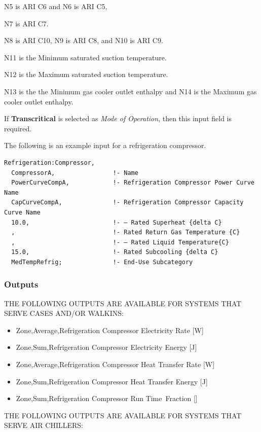 N5 is ARI C6 and N6 is ARI C5,

N7 is ARI C7.

N8 is ARI C10, N9 is ARI C8, and N10 is ARI C9.

N11 is the Minimum saturated suction temperature.

N12 is the Maximum saturated suction temperature.

N13 is the the Minimum gas cooler outlet enthalpy and N14 is the Maximum gas cooler outlet enthalpy.

If \textbf{Transcritical} is selected as \textit{Mode of Operation}, then this input field is required.

The following is an example input for a refrigeration compressor.

\begin{lstlisting}
Refrigeration:Compressor,
  CompressorA,                !- Name
  PowerCurveCompA,            !- Refrigeration Compressor Power Curve Name
  CapCurveCompA,              !- Refrigeration Compressor Capacity Curve Name
  10.0,                       !- – Rated Superheat {delta C}
  ,                           !- Rated Return Gas Temperature {C}
  ,                           !- – Rated Liquid Temperature{C}
  15.0,                       !- Rated Subcooling {delta C}
  MedTempRefrig;              !- End-Use Subcategory
\end{lstlisting}

\subsubsection{Outputs}\label{outputs-4-013}

THE FOLLOWING OUTPUTS ARE AVAILABLE FOR SYSTEMS THAT SERVE CASES AND/OR WALKINS:

\begin{itemize}
\item
  Zone,Average,Refrigeration Compressor Electricity Rate {[}W{]}
\item
  Zone,Sum,Refrigeration Compressor Electricity Energy {[}J{]}
\item
  Zone,Average,Refrigeration Compressor Heat Transfer Rate {[}W{]}
\item
  Zone,Sum,Refrigeration Compressor Heat Transfer Energy {[}J{]}
\item
  Zone,Sum,Refrigeration Compressor Run Time~Fraction {[]}
\end{itemize}

THE FOLLOWING OUTPUTS ARE AVAILABLE FOR SYSTEMS THAT SERVE AIR CHILLERS:

